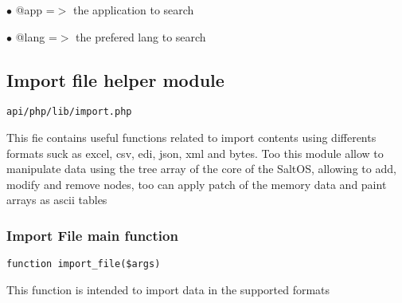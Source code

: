 \documentclass[a4paper]{article}
\begin{document}
\begin{compactitem}
\item[\color{myblue}$\bullet$] @app  =$>$ the application to search
\item[\color{myblue}$\bullet$] @lang =$>$ the prefered lang to search
\end{compactitem}

\hypertarget{toc461}{}
\subsection{Import file helper module}

\begin{lstlisting}
api/php/lib/import.php
\end{lstlisting}

This fie contains useful functions related to import contents using differents formats suck as
excel, csv, edi, json, xml and bytes. Too this module allow to manipulate data using the tree
array of the core of the SaltOS, allowing to add, modify and remove nodes, too can apply patch
of the memory data and paint arrays as ascii tables

\hypertarget{toc462}{}
\subsubsection{Import File main function}

\begin{lstlisting}
function import_file($args)
\end{lstlisting}

This function is intended to import data in the supported formats
\end{document}

